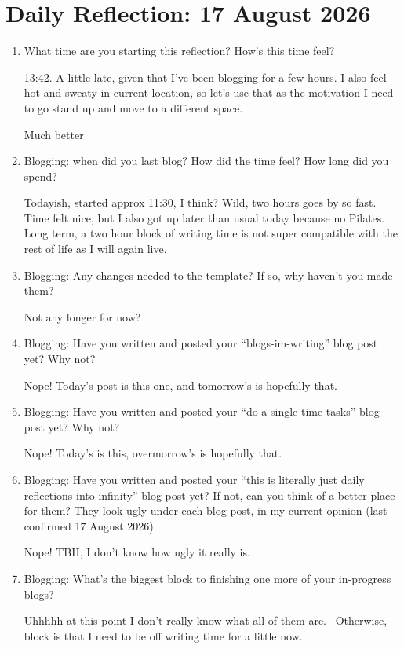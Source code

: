 \documentclass[12pt]{article}
\newcommand{\say}[1]{``#1''}
\renewcommand{\,}{\textsuperscript{,}}
\newcommand{\dailyreflect}[1]{\section{Daily Reflection: #1}}
\begin{document}
\dailyreflect{17 August 2026}

\begin{enumerate}

\item What time are you starting this reflection? How's this time feel?

13:42. A little late, given that I've been blogging for a few hours. I also feel hot and sweaty in current location, so let's use that as the motivation I need to go stand up and move to a different space.

Much better

\item Blogging: when did you last blog? How did the time feel? How long did you spend?

Todayish, started approx 11:30, I think? Wild, two hours goes by so fast. Time felt nice, but I also got up later than usual today because no Pilates.  
Long term, a two hour block of writing time is not super compatible with the rest of life as I will again live.

\item Blogging: Any changes needed to the template? If so, why haven't you made them?

Not any longer for now?

\item Blogging: Have you written and posted your \say{blogs-im-writing} blog post yet? Why not?

Nope! Today's post is this one, and tomorrow's is hopefully that.

\item Blogging: Have you written and posted your \say{do a single time tasks} blog post yet? Why not?

Nope! Today's is this, overmorrow's is hopefully that.

\item Blogging: Have you written and posted your \say{this is literally just daily reflections into infinity} blog post yet? If not, can you think of a better place for them? They look ugly under each blog post, in my current opinion (last confirmed 17 August 2026)

Nope! TBH, I don't know how ugly it really is.

\item Blogging: What's the biggest block to finishing one more of your in-progress blogs?

Uhhhhh at this point I don't really know what all of them are.   
Otherwise, block is that I need to be off writing time for a little now.


\end{enumerate}
\end{document}
